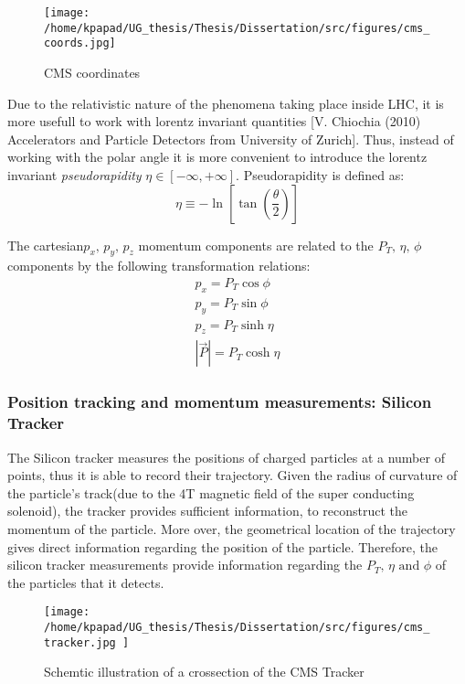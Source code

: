 \begin{figure}[ht]
\centering
\texttt{[image: /home/kpapad/UG\_thesis/Thesis/Dissertation/src/figures/cms\_coords.jpg]}
\caption{CMS coordinates}
\label{fig:CMSCoords}
\end{figure}


Due to the relativistic nature of the phenomena taking place inside LHC, it is more usefull to work with lorentz invariant quantities [V. Chiochia (2010) Accelerators and Particle Detectors from University of Zurich]. Thus, instead of working with the polar angle it is more convenient to introduce the lorentz invariant  \emph{pseudorapidity} \(\eta\in \left [ -\infty, +\infty \right ]\).  Pseudorapidity is defined as:
\begin{equation}
\eta \equiv -\ln{\left [ \tan\left (\frac{\theta}{2} \right ) \right]  }
\end{equation}

The cartesian\(p_{x}\text{, } p_{y}\text{, }p_{z}\) momentum components are related to the \(P_{T}\text{, }\eta\text{, }\phi\)  components by the following transformation relations:
\begin{equation}
\begin{matrix}
p_{x} = P_{T}\cos{\phi} \\
p_{y} = P_{T}\sin{\phi} \\
p_{z} = P_{T}\sinh{\eta}\\
|\vec{P}| = P_{T}\cosh{\eta} 
\end{matrix}
\end{equation}

\subsubsection{Position tracking and momentum measurements: Silicon Tracker}
\label{sec:org2c477d8}
The Silicon tracker measures the positions of charged particles at a number of points, thus it is able to record their trajectory. Given the radius of curvature of the particle's track(due to the 4T magnetic field of the super conducting solenoid), the tracker provides sufficient information, to reconstruct the momentum of the particle. More over, the geometrical location of the trajectory gives direct information regarding the position of the particle. Therefore, the silicon tracker measurements  provide  information regarding the \(P_{T}\text{, } \eta\text{ and }\phi\) of the particles that it detects.

\begin{figure}[ht]
\centering
\texttt{[image: /home/kpapad/UG\_thesis/Thesis/Dissertation/src/figures/cms\_tracker.jpg ]}
\caption{Schemtic illustration of a crossection of the CMS Tracker }
\label{fig:si_tracker}
\end{figure}


